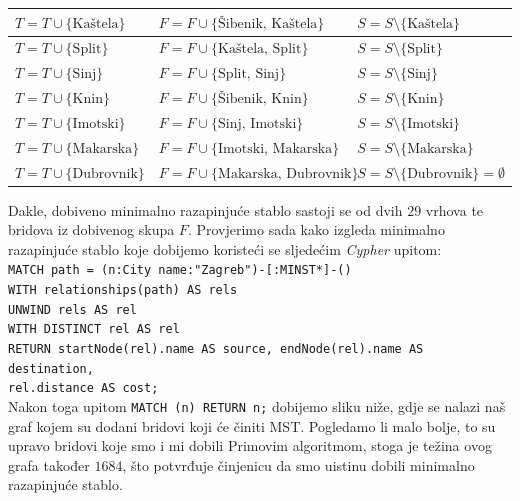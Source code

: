 \documentclass[10pt]{scrartcl}
\begin{document}
\begin{table}[H]
\begin{tabular}{|l|l|l|}
\hline
$T = T \cup \{\text{Kaštela}\}$        & $F = F \cup \{\text{Šibenik, Kaštela}\}$                & $S = S \setminus \{\text{Kaštela}\}$                  \\ 
\hline
$T = T \cup \{\text{Split}\}$          & $F = F \cup \{\text{Kaštela, Split}\}$                 & $S = S \setminus \{\text{Split}\}$                     \\ 
\hline
$T = T \cup \{\text{Sinj}\}$           & $F = F \cup \{\text{Split, Sinj}\}$                   & $S = S \setminus \{\text{Sinj}\}$                      \\ 
\hline
$T = T \cup \{\text{Knin}\}$           & $F = F \cup \{\text{Šibenik, Knin}\}$                 & $S = S \setminus \{\text{Knin}\}$                      \\ 
\hline
$T = T \cup \{\text{Imotski}\}$        & $F = F \cup \{\text{Sinj, Imotski}\}$                 & $S = S \setminus \{\text{Imotski}\}$                   \\ 
\hline
$T = T \cup \{\text{Makarska}\}$       & $F = F \cup \{\text{Imotski, Makarska}\}$             & $S = S \setminus \{\text{Makarska}\}$                  \\ 
\hline
$T = T \cup \{\text{Dubrovnik}\}$      & $F = F \cup \{\text{Makarska, Dubrovnik}\}$           & $S = S \setminus \{\text{Dubrovnik}\} = \emptyset$                 \\
\hline
\end{tabular}
\end{table}
Dakle, dobiveno minimalno razapinjuće stablo sastoji se od dvih $29$ vrhova te bridova iz dobivenog skupa $F$. Provjerimo sada kako izgleda minimalno razapinjuće stablo koje dobijemo koristeći se sljedećim \emph{Cypher} upitom:\\
\newline
\texttt{MATCH path = (n:City {name:"Zagreb"})-[:MINST*]-()}\\
\texttt{WITH relationships(path) AS rels}\\
\texttt{UNWIND rels AS rel}\\
\texttt{WITH DISTINCT rel AS rel} \\
\texttt{RETURN startNode(rel).name AS source, endNode(rel).name AS destination,}\\
\texttt{rel.distance AS cost;}\\
Nakon toga upitom 
\texttt{MATCH (n) RETURN n;}
dobijemo sliku niže, gdje se nalazi naš graf kojem su dodani bridovi koji će činiti MST. Pogledamo li malo bolje, to su upravo bridovi koje smo i mi dobili Primovim algoritmom, stoga je težina ovog grafa također $1684$, što potvrđuje činjenicu da smo uistinu dobili minimalno razapinjuće stablo. \\
\end{document}
